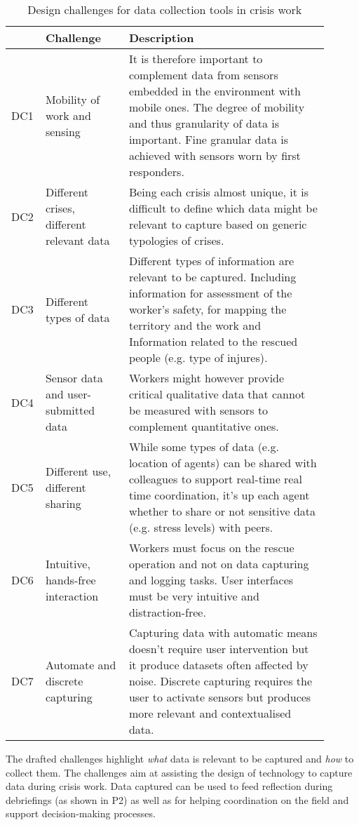 \begin{table}[tbh] 
	\centering 
	\caption{Design challenges for data collection tools in crisis work} 
	\label{tab:design-challenges} 
	\begin{tabular}{@{}p{0.05\linewidth}p{0.25\linewidth}p{0.60\linewidth}@{}} 
		\toprule  
		& Challenge & Description \\
		\midrule 
		DC1 & Mobility of work and sensing &
		It is therefore important to complement data from sensors embedded in the environment with mobile ones. The degree of mobility and thus granularity of data is important. Fine granular data is achieved with sensors worn by first responders. \\
		DC2 & Different crises, different relevant data & 
		Being each crisis almost unique, it is difficult to define which data might be relevant to capture based on generic typologies of crises. \\
		DC3 & Different types of data & Different types of information are relevant to be captured. Including information for assessment of the worker’s safety, for mapping the territory and the work and Information related to the rescued people (e.g. type of injures). \\
		DC4 & Sensor data and user-submitted data &
		Workers might however provide critical qualitative data that cannot be measured with sensors to complement quantitative ones. \\
		DC5 & Different use, different sharing &
		While some types of data (e.g. location of agents) can be shared with colleagues to support real-time real time coordination, it's up each agent whether to share or not sensitive data (e.g. stress levels) with peers. \\  
		DC6 & Intuitive, hands-free interaction & 
		Workers must focus on the rescue operation and not on data capturing and logging tasks. User interfaces must be very intuitive and distraction-free. \\
		DC7 & Automate and discrete capturing & Capturing data with automatic means doesn't require user intervention but it produce datasets often affected by noise. Discrete capturing requires the user to activate sensors but produces more relevant and contextualised data. \\ 
		\bottomrule 
	\end{tabular}
\end{table}

The drafted challenges highlight \emph{what} data is relevant to be captured and \emph{how} to collect them. The challenges aim at assisting the design of technology to capture data during crisis work. Data captured can be used to feed reflection during debriefings (as shown in P2) as well as for helping coordination on the field and support decision-making processes.

